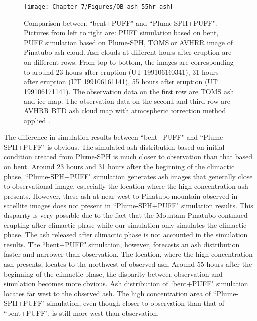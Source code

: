 \begin{figure}[!htb]
\begin{minipage}{.325 \textwidth}
    \end{minipage}%
    \begin{minipage}{.325 \textwidth}
        \centering
        \texttt{[image: Chapter-7/Figures/OB-ash-55hr-ash]}
    \end{minipage}%
    \caption{Comparison between ``bent+PUFF" and ``Plume-SPH+PUFF". Pictures from left to right are: PUFF simulation based on bent, PUFF simulation based on Plume-SPH, TOMS or AVHRR image of Pinatubo ash cloud. Ash clouds at different hours after eruption are on different rows. From top to bottom, the images are corresponding to around 23 hours after eruption (UT 199106160341), 31 hours after eruption (UT 199106161141), 55 hours after eruption (UT 199106171141). The observation data on the first row are TOMS ash and ice map. The observation data on the second and third row are AVHRR BTD ash cloud map with atmospheric correction method applied \citep{guo2004particles}.}
    \label{fig:Plume-SPH-PUFF-ash-cloud}
\end{figure}

The difference in simulation results between ``bent+PUFF" and ``Plume-SPH+PUFF" is obvious. The simulated ash distribution based on initial condition created from Plume-SPH is much closer to observation than that based on bent. Around 23 hours and 31 hours after the beginning of the climactic phase, ``Plume-SPH+PUFF" simulation generates ash images that generally close to observational image, especially the location where the high concentration ash presents. However, these ash at near west to Pinatubo mountain observed in satellite images does not present in ``Plume-SPH+PUFF" simulation results. This disparity is very possible due to the fact that the Mountain Pinatubo continued erupting after climactic phase while our simulation only simulates the climactic phase. The ash released after climactic phase is not accounted in the simulation results. The ``bent+PUFF" simulation, however, forecasts an ash distribution faster and narrower than observation. The location, where the high concentration ash presents, locates to the northwest of observed ash. 
Around 55 hours after the beginning of the climactic phase, the disparity between observation and simulation becomes more obvious. Ash distribution of ``bent+PUFF" simulation locates far west to the observed ash. The high concentration area of ``Plume-SPH+PUFF" simulation, even though closer to observation than that of ``bent+PUFF", is still more west than observation.

